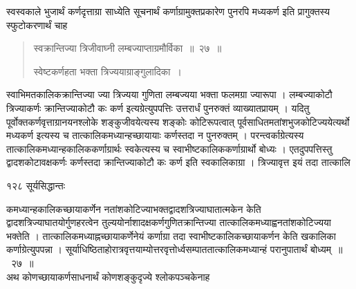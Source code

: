 \documentclass[11pt, openany]{book}
\begin{document}
\noindent स्वस्वकाले भुजार्थं कर्णदृत्ताग्रा साध्येति सूचनार्थं कर्णाग्रामुक्तप्रकारेण पुनरपि मध्यकर्ण इति प्रागुक्तस्य स्फुटोकरणार्थं चाह\textendash



\begin{quote}
  {\ssi स्वक्रान्तिज्या त्रिजीवाघ्नी लम्बज्याप्ताग्रमौर्विका~॥~२७~॥

 स्वेष्टकर्णहता भक्ता त्रिज्ययाग्राङ्गुलादिका~।}
\end{quote}

\begin{sloppypar}
 स्वाभिमतकालिकक्रान्तिज्या ज्या त्रिज्यया गुणिता लम्बज्यया भक्ता फलमग्रा ज्यारूपा । लम्बज्याकोटौ त्रिज्याकर्णः क्रान्तिज्याकोटौ कः कर्ण इत्यग्रेत्युपपत्तिः उत्तरार्धं पुनरुक्तं व्याख्यातप्रायम् । यदितु पूर्वोक्तकर्णवृत्ताग्रानयनश्लोके शङ्कुजीवयेत्यस्य शङ्कोः कोटिरूपत्वात् पूर्वसाधितमतांशभुजकोटिज्ययेत्यर्थो मध्यकर्ण इत्यस्य च तात्कालिकमध्यान्हच्छायायाः कर्णस्तदा न पुनरुक्तम् । परन्त्वर्काग्रेत्यस्य तात्कालिकमध्यान्हकालिककर्णाग्रार्थः स्वकेत्यस्य च स्वाभीष्टकालिककर्णाग्रार्थो बोध्यः । एतदुपपत्तिस्तु द्वादशकोटावक्षकर्णः कर्णस्तदा क्रान्तिज्याकोटौ कः कर्ण इति स्वकालिकाग्रा । त्रिज्यावृत्त इयं तदा तात्कालि\textendash
\end{sloppypar}





\newpage

\noindent १२८ \hspace{4cm} सूर्यसिद्धान्तः
\vspace{1cm}

\begin{sloppypar}
कमध्यान्हकालिकच्छायाकर्णेन नतांशकोटिज्याभक्तद्वादशत्रिज्याघातात्मकेन केति द्वादशत्रिज्याघातयोर्गुणहरत्वेन तुल्ययोर्नाशादक्षकर्णगुणितक्रान्तिज्या तात्कालिकमध्याह्वनतांशकोटिज्यया भक्तेति । तात्कालिकमध्याह्नच्छायाकर्णेनेयं कर्णाग्रा तदा स्वाभीष्टकालिकच्छायाकर्णन केति खकालिका कर्णाग्रेत्युपपन्ना । सूर्याधिष्ठिताहोरात्रवृत्तयाम्योत्तरवृत्तोर्ध्वसम्पाततात्कालिकमध्यान्हं परानुपातार्थं बोध्यम्~॥~२७~॥\\
\noindent अथ कोणच्छायाकर्णसाधनार्थं कोणशङ्कुदृज्ये श्लोकपञ्चकेनाह\textendash
\end{sloppypar}
\vspace{2mm}
\end{document}
